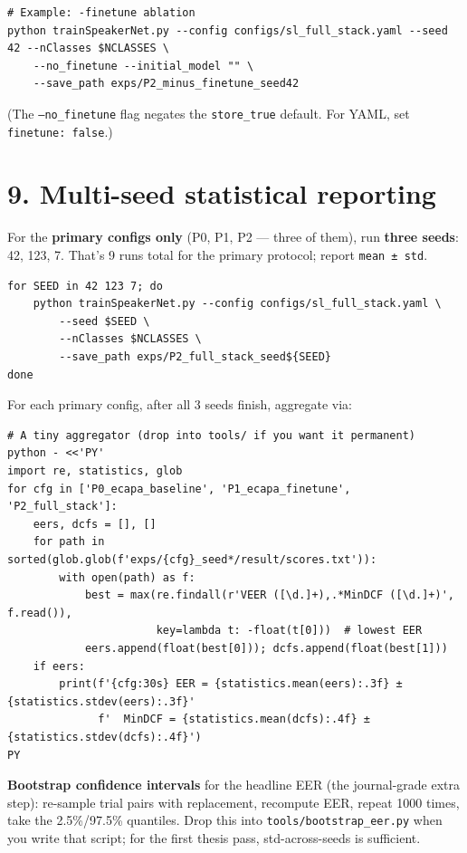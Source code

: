 \documentclass[10pt,a4paper]{article}
\begin{document}
\begin{Verbatim}[fontsize=\small,frame=single,framesep=4pt]
# Example: -finetune ablation
python trainSpeakerNet.py --config configs/sl_full_stack.yaml --seed 42 --nClasses $NCLASSES \
    --no_finetune --initial_model "" \
    --save_path exps/P2_minus_finetune_seed42
\end{Verbatim}


(The \texttt{--no\_finetune} flag negates the \texttt{store\_true} default. For YAML, set \texttt{finetune: false}.)

\section*{9. Multi-seed statistical reporting}

For the \textbf{primary configs only} (P0, P1, P2 --- three of them), run \textbf{three seeds}: 42, 123, 7. That's 9 runs total for the primary protocol; report \texttt{mean ± std}.


\begin{Verbatim}[fontsize=\small,frame=single,framesep=4pt]
for SEED in 42 123 7; do
    python trainSpeakerNet.py --config configs/sl_full_stack.yaml \
        --seed $SEED \
        --nClasses $NCLASSES \
        --save_path exps/P2_full_stack_seed${SEED}
done
\end{Verbatim}


For each primary config, after all 3 seeds finish, aggregate via:

\begin{Verbatim}[fontsize=\small,frame=single,framesep=4pt]
# A tiny aggregator (drop into tools/ if you want it permanent)
python - <<'PY'
import re, statistics, glob
for cfg in ['P0_ecapa_baseline', 'P1_ecapa_finetune', 'P2_full_stack']:
    eers, dcfs = [], []
    for path in sorted(glob.glob(f'exps/{cfg}_seed*/result/scores.txt')):
        with open(path) as f:
            best = max(re.findall(r'VEER ([\d.]+),.*MinDCF ([\d.]+)', f.read()),
                       key=lambda t: -float(t[0]))  # lowest EER
            eers.append(float(best[0])); dcfs.append(float(best[1]))
    if eers:
        print(f'{cfg:30s} EER = {statistics.mean(eers):.3f} ± {statistics.stdev(eers):.3f}'
              f'  MinDCF = {statistics.mean(dcfs):.4f} ± {statistics.stdev(dcfs):.4f}')
PY
\end{Verbatim}


\textbf{Bootstrap confidence intervals} for the headline EER (the journal-grade extra step): re-sample trial pairs with replacement, recompute EER, repeat 1000 times, take the 2.5\%/97.5\% quantiles. Drop this into \texttt{tools/bootstrap\_eer.py} when you write that script; for the first thesis pass, std-across-seeds is sufficient.
\end{document}

